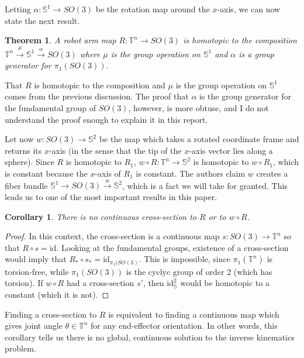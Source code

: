 \documentclass[12pt]{article}
\newtheorem{thm}{Theorem}
\newtheorem*{cor}{Corollary}
\theoremstyle{definition}
\begin{document}
Letting \(\alpha : \mathbb{S}^1 \rightarrow SO(3)\) be the rotation map around
the \(x\)-axis, we can now state the next result.
\begin{thm}
    A robot arm map \(R : \mathbb{T}^n \rightarrow SO(3)\) is homotopic to 
    the composition 
    \(\mathbb{T}^n \xrightarrow{\mu} \mathbb{S}^1 \xrightarrow{\alpha} SO(3)\)
    where \(\mu\) is the group operation on \(\mathbb{S}^1\) and \(\alpha\) is a
    group generator for \(\pi_1\left(SO(3)\right)\).
\end{thm}

That \(R\) is homotopic to the composition and \(\mu\) is the group operation on
\(\mathbb{S}^1\) comes from the previous discussion. The proof that \(\alpha\)
is the group generator for the fundamental group of \(SO(3)\), however, is more
obtuse, and I do not understand the proof enough to explain it in this report. 

Let now \(w : SO(3) \rightarrow \mathbb{S}^2\) be the map which takes a rotated
coordinate frame and returns its \(x\)-axis (in the sense that the tip of the
\(x\)-axis vector lies along a sphere).
Since \(R\) is homotopic to \(R_1\), 
\(w \circ R : \mathbb{T}^n \rightarrow \mathbb{S}^2\) is homotopic to 
\(w \circ R_1\), which is constant because the \(x\)-axis of \(R_1\) is
constant. The authors claim \(w\) creates a fiber bundle 
\(\mathbb{S}^1 \rightarrow SO(3) \xrightarrow{w} \mathbb{S}^2\), which is a fact
we will take for granted. This leads us to one of the most important results in
this paper.

\begin{cor}
    There is no continuous cross-section to \(R\) or to \(w \circ R\).
\end{cor}
\begin{proof}
    In this context, the cross-section is a continuous map 
    \(s : SO(3) \rightarrow \mathbb{T}^n\) so that \(R \circ s = \text{id}\). 
    Looking at the fundamental groups, existence of a cross-section would imply
    that \(R_* \circ s_* = \text{id}_{\pi_1(SO(3)}\). This is impossible, since
    \(\pi_1(\mathbb{T}^n)\) is torsion-free, while
    \(\pi_1(SO(3))\) is the cyclyc group of order 2 (which has torsion). 
    If \(w \circ R\) had a cross-section \(s'\), then \(\text{id}_\mathbb{S}^2\)
    would be homotopic to a constant (which it is not).
\end{proof}

Finding a cross-section to \(R\) is equivalent to finding a continuous map which
gives joint angle \(\theta \in \mathbb{T}^n\) for any end-effector orientation.
In other words, this corollary tells us there is no global, continuous solution
to the inverse kinematics problem.
\end{document}
